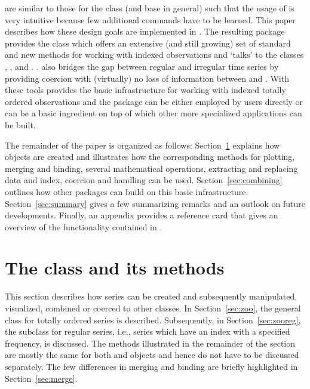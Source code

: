 \documentclass{Z}
\begin{document}
are similar to those for the  class (and base  in
general) such that the usage of  is very intuitive because
few additional commands have to be learned. 
This paper describes how these design goals are implemented in .
The resulting package provides the  class which offers an
extensive (and still growing) set of standard and new methods for working
with indexed observations and `talks' to the classes , ,
 and . \citep[In addition to these independent
approaches, the class  built upon  was recently
introduced by][.]{zoo:xts:2008}.  also bridges the gap
between regular and irregular time series by providing coercion with (virtually)
no loss of information between  and .
With these tools  provides the basic infrastructure for
working with indexed totally ordered observations and the package can be either employed by
users directly or can be a basic ingredient on top of which other more specialized
applications can be built.

The remainder of the paper is organized as follows:
Section~\ref{sec:zoo-class} explains how  objects are created
and illustrates how the corresponding methods for plotting, merging and
binding, several mathematical operations, extracting and replacing data
and index, coercion and  handling can be used. Section~\ref{sec:combining}
outlines how other packages can build on this basic infrastructure.
Section~\ref{sec:summary} gives a few summarizing remarks and an outlook
on future developments. Finally, an appendix provides a reference card that
gives an overview of the functionality contained in .


\section[The class "zoo" and its methods]{The class  and its methods}
\label{sec:zoo-class}

This section describes how  series can be created and subsequently
manipulated, visualized, combined or coerced to other classes. In Section~\ref{sec:zoo},
the general class  for totally ordered series is described. Subsequently,
in Section~\ref{sec:zooreg}, the subclass  for
regular  series, i.e., series which have an index with a specified
frequency, is discussed. The methods illustrated in the remainder of the
section are mostly the same for both  and  objects
and hence do not have to be discussed separately. The few differences in merging and
binding are briefly highlighted in Section~\ref{sec:merge}.
\end{document}
